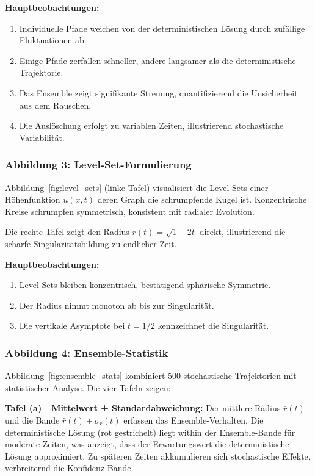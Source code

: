 \documentclass[a4paper,12pt]{article}
\theoremstyle{definition}
\begin{document}
\textbf{Hauptbeobachtungen:}
\begin{enumerate}
	\item Individuelle Pfade weichen von der deterministischen Lösung durch zufällige Fluktuationen ab.
	\item Einige Pfade zerfallen schneller, andere langsamer als die deterministische Trajektorie.
	\item Das Ensemble zeigt signifikante Streuung, quantifizierend die Unsicherheit aus dem Rauschen.
	\item Die Auslöschung erfolgt zu variablen Zeiten, illustrierend stochastische Variabilität.
\end{enumerate}

\subsubsection{Abbildung 3: Level-Set-Formulierung}

Abbildung~\ref{fig:level_sets} (linke Tafel) visualisiert die Level-Sets einer Höhenfunktion $u(x,t)$ deren Graph die schrumpfende Kugel ist. Konzentrische Kreise schrumpfen symmetrisch, konsistent mit radialer Evolution.

Die rechte Tafel zeigt den Radius $r(t) = \sqrt{1 - 2t}$ direkt, illustrierend die scharfe Singularitätsbildung zu endlicher Zeit.

\textbf{Hauptbeobachtungen:}
\begin{enumerate}
	\item Level-Sets bleiben konzentrisch, bestätigend sphärische Symmetrie.
	\item Der Radius nimmt monoton ab bis zur Singularität.
	\item Die vertikale Asymptote bei $t = 1/2$ kennzeichnet die Singularität.
\end{enumerate}

\subsubsection{Abbildung 4: Ensemble-Statistik}

Abbildung~\ref{fig:ensemble_stats} kombiniert 500 stochastische Trajektorien mit statistischer Analyse. Die vier Tafeln zeigen:

\textbf{Tafel (a)---Mittelwert ± Standardabweichung:} Der mittlere Radius $\bar{r}(t)$ und die Bande $\bar{r}(t) \pm \sigma_r(t)$ erfassen das Ensemble-Verhalten. Die deterministische Lösung (rot gestrichelt) liegt within der Ensemble-Bande für moderate Zeiten, was anzeigt, dass der Erwartungswert die deterministische Lösung approximiert. Zu späteren Zeiten akkumulieren sich stochastische Effekte, verbreiternd die Konfidenz-Bande.
\end{document}
